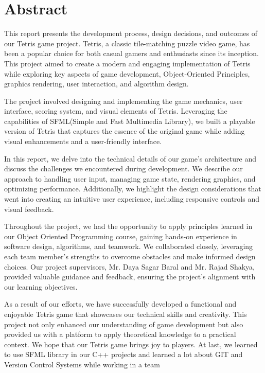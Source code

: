 

\newpage
\section{Abstract}

This report presents the development process, design decisions, and outcomes of our Tetris game project. Tetris, a classic tile-matching puzzle video game, has been a popular choice for both casual gamers and enthusiasts since its inception. This project aimed to create a modern and engaging implementation of Tetris while exploring key aspects of game development, Object-Oriented Principles, graphics rendering, user interaction, and algorithm design.

The project involved designing and implementing the game mechanics, user interface, scoring system, and visual elements of Tetris. Leveraging the capabilities of SFML(Simple and Fast Multimedia Library), we built a playable version of Tetris that captures the essence of the original game while adding visual enhancements and a user-friendly interface. 

In this report, we delve into the technical details of our game's architecture and discuss the challenges we encountered during development. We describe our approach to handling user input, managing game state, rendering graphics, and optimizing performance. Additionally, we highlight the design considerations that went into creating an intuitive user experience, including responsive controls and visual feedback.

Throughout the project, we had the opportunity to apply principles learned in our Object Oriented Programming course, gaining hands-on experience in software design, algorithms, and teamwork. We collaborated closely, leveraging each team member's strengths to overcome obstacles and make informed design choices. Our project supervisors, Mr. Daya Sagar Baral and Mr. Rajad Shakya, provided valuable guidance and feedback, ensuring the project's alignment with our learning objectives.

As a result of our efforts, we have successfully developed a functional and enjoyable Tetris game that showcases our technical skills and creativity. This project not only enhanced our understanding of game development but also provided us with a platform to apply theoretical knowledge to a practical context. We hope that our Tetris game brings joy to players.
At last, we learned to use SFML library in our C++ projects and learned a lot about GIT and Version Control Systems while working in a team\\
